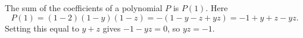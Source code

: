 The sum of the coefficients of a polynomial $P$ is $P(1)$. Here
\[P(1)=(1-2)(1-y)(1-z)=-(1-y-z+yz)=-1+y+z-yz.\]
Setting this equal to $y+z$ gives $-1-yz=0$, so $yz=\boxed{-1}$.
